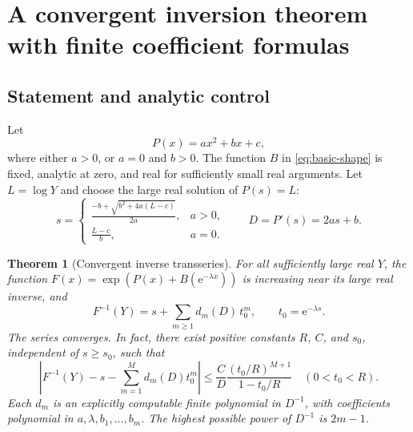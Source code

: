 \documentclass[11pt]{article}
\numberwithin{equation}{section}
\newtheorem{theorem}{Theorem}[section]
\theoremstyle{definition}
\newcommand{\ee}{\mathrm e}
\begin{document}
\section{A convergent inversion theorem with finite coefficient formulas}
\label{sec:engine}

\subsection{Statement and analytic control}

Let
\begin{equation}\label{eq:Pquadratic}
 P(x)=a x^2+b x+c,
\end{equation}
where either $a>0$, or $a=0$ and $b>0$. The function $B$ in \eqref{eq:basic-shape} is fixed, analytic at zero, and real for sufficiently small real arguments. Let $L=\log Y$ and choose the large real solution of $P(s)=L$:
\begin{equation}\label{eq:center}
 s=\begin{cases}
 \displaystyle\frac{-b+\sqrt{b^2+4a(L-c)}}{2a},&a>0,\\[0.8em]
 \displaystyle\frac{L-c}{b},&a=0.
 \end{cases}
 \qquad D=P'(s)=2as+b.
\end{equation}

\begin{theorem}[Convergent inverse transseries]\label{thm:inverse}
For all sufficiently large real $Y$, the function
$F(x)=\exp(P(x)+B(\ee^{-\lambda x}))$ is increasing near its large real inverse, and
\begin{equation}\label{eq:inverse-full}
 F^{-1}(Y)=s+\sum_{m\ge1}d_m(D)\,t_0^m,
 \qquad t_0=\ee^{-\lambda s}.
\end{equation}
The series converges. In fact, there exist positive constants $R$, $C$, and $s_0$, independent of $s\ge s_0$, such that
\begin{equation}\label{eq:inverse-remainder}
 \left|F^{-1}(Y)-s-\sum_{m=1}^M d_m(D)t_0^m\right|
 \le \frac{C}{D}\frac{(t_0/R)^{M+1}}{1-t_0/R}
 \quad(0<t_0<R).
\end{equation}
Each $d_m$ is an explicitly computable finite polynomial in $D^{-1}$, with coefficients polynomial in $a,\lambda,b_1,\ldots,b_m$. The highest possible power of $D^{-1}$ is $2m-1$.
\end{theorem}
\end{document}
